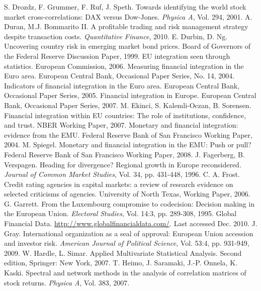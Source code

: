 \documentclass[3p]{elsarticle}
\begin{document}
\begin{thebibliography}
 S. Drozdz, F. Grummer, F. Ruf, J. Speth.  Towards identifying the world stock market cross-correlations: DAX versus Dow-Jones.  \textit{Physica A}, Vol. 294, 2001.
 A. Duran, M.J. Bommarito II.  A profitable trading and risk management strategy despite transaction costs.  \textit{Quantitative Finance}, 2010.
 E. Durbin, D. Ng. Uncovering country risk in emerging market bond prices. Board of Governors of the Federal Reserve Discussion Paper, 1999.
 EU integration seen through statistics. European Commission, 2006.
 Measuring financial integration in the Euro area. European Central Bank, Occasional Paper Series, No. 14, 2004.
 Indicators of financial integration in the Euro area. European Central Bank, Occasional Paper Series, 2005.
 Financial integration in Europe. European Central Bank, Occasional Paper Series, 2007.
 M. Ekinci, S. Kalemli-Oczan, B. Sorensen. Financial integration within EU countries: The role of institutions, confidence, and trust. NBER Working Paper, 2007.
 Monetary and financial integration: evidence from the EMU. Federal Reserve Bank of San Francisco Working Paper, 2004.
 M. Spiegel. Monetary and financial integration in the EMU: Push or pull? Federal Reserve Bank of San Francisco Working Paper, 2008.
 J. Fagerberg, B. Verspagen. Heading for divergence? Regional growth in Europe reconsidered. \textit{Journal of Common Market Studies}, Vol. 34, pp. 431-448, 1996.
 C. A. Frost. Credit rating agencies in capital markets: a review of research evidence on selected criticisms of agencies.  University of North Texas,  Working Paper, 2006.
 G. Garrett.  From the Luxembourg compromise to codecision: Decision making in the European Union.  \textit{Electoral Studies}, Vol. 14:3, pp. 289-308, 1995.
 Global Financial Data.  \url{http://www.globalfinancialdata.com/}.  Last accessed Dec. 2010.
 J. Gray. International organization as a seal of approval: European Union accession and investor risk. \textit{American Journal of Political Science}, Vol. 53:4, pp. 931-949, 2009.
 W. Hardle, L. Simar. Applied Multivariate Statistical Analysis. Second edition, Springer: New York, 2007.
 T. Heimo, J. Saramaki, J.-P. Onnela, K. Kaski. Spectral and network methods in the analysis of correlation matrices of stock returns. \textit{Physica A}, Vol. 383, 2007.

\end{thebibliography}
\end{document}
